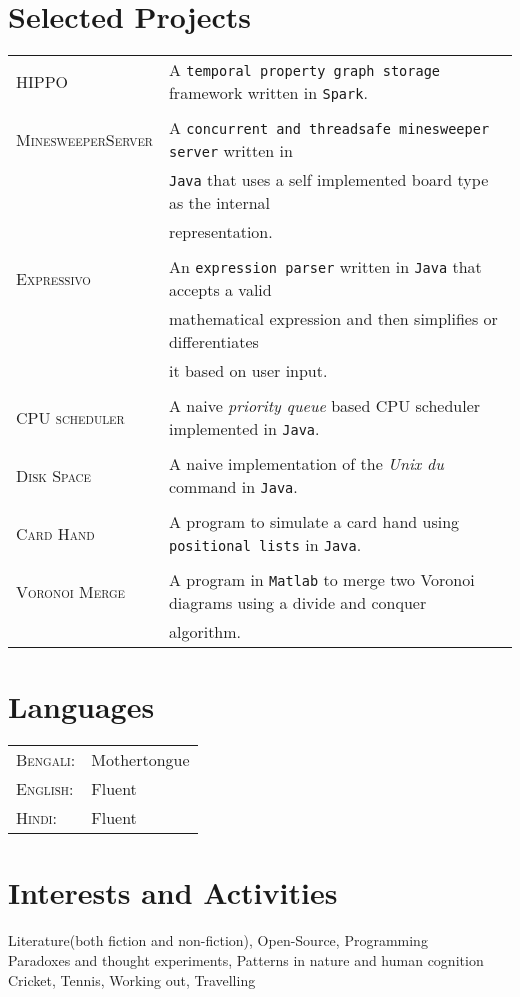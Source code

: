 \documentclass[a4paper,10pt]{article}
\begin{document}
\section{Selected Projects}
\begin{tabular}{ll}
\textsc{HIPPO} & \normalsize A \texttt{temporal property graph storage} framework written in \texttt{Spark}.\\&
\\\textsc{MinesweeperServer} & \normalsize A \texttt{concurrent and threadsafe minesweeper server} written in \\& \normalsize \texttt{Java} that uses a self implemented board type as the internal \\&\normalsize representation.\\&
\\\textsc{Expressivo} & \normalsize An \texttt{expression parser} written in \texttt{Java} that accepts a valid \\& \normalsize mathematical expression and then simplifies or differentiates \\&\normalsize it based on user input.\\&
\\\textsc{CPU scheduler} & \normalsize A naive \textit{priority queue} based CPU scheduler implemented in \texttt{Java}.\\&
\\\textsc{Disk Space} & \normalsize A naive implementation of the \textit{Unix du} command in \texttt{Java}.\\&
\\\textsc{Card Hand} & \normalsize A program to simulate a card hand using \texttt{positional lists} in \texttt{Java}.\\&
\\\textsc{Voronoi Merge} & \normalsize A program in \texttt{Matlab} to merge two Voronoi diagrams using a divide and conquer\\& \normalsize algorithm.
\end{tabular}
\section{Languages}
\begin{tabular}{ll}
 \textsc{Bengali:}&Mothertongue\\
\textsc{English:}&Fluent\\
\textsc{Hindi:}&Fluent\\
\end{tabular}

\section{Interests and Activities}
Literature(both fiction and non-fiction), Open-Source, Programming\\
Paradoxes and thought experiments, Patterns in nature and human cognition\\
Cricket, Tennis, Working out, Travelling
\end{document}
